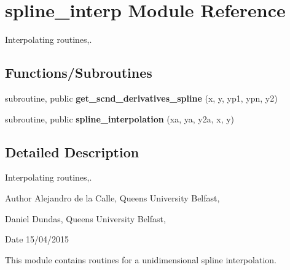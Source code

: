 \hypertarget{namespacespline__interp}{}\section{spline\+\_\+interp Module Reference}
\label{namespacespline__interp}


Interpolating routines,.  


\subsection*{Functions/\+Subroutines}
\begin{DoxyCompactItemize}
\item 
\mbox{\label{namespacespline__interp_a2019ce6ce4f8a7d8bf49e1606a7b5ec2}} 
subroutine, public {\bfseries get\+\_\+scnd\+\_\+derivatives\+\_\+spline} (x, y, yp1, ypn, y2)
\item 
\mbox{\label{namespacespline__interp_a2dd4ae64baa2f9b89f7a9f44e16eecc2}} 
subroutine, public {\bfseries spline\+\_\+interpolation} (xa, ya, y2a, x, y)
\end{DoxyCompactItemize}


\subsection{Detailed Description}
Interpolating routines,. 

\begin{DoxyAuthor}{Author}
Alejandro de la Calle, Queen\textquotesingle{}s University Belfast, 

Daniel Dundas, Queen\textquotesingle{}s University Belfast, 
\end{DoxyAuthor}
\begin{DoxyDate}{Date}
15/04/2015
\end{DoxyDate}
This module contains routines for a unidimensional spline interpolation. 